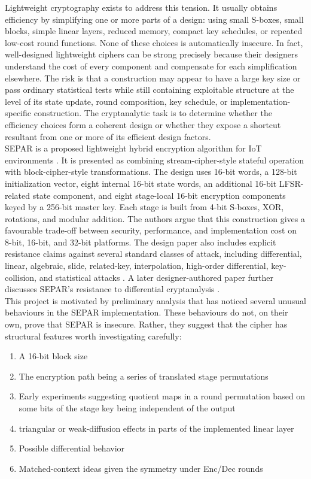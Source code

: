 \documentclass[11pt]{article}
\begin{document}
Lightweight cryptography exists to address this tension. It usually obtains efficiency by simplifying one or more parts of a design: using small S-boxes, small blocks, simple linear layers, reduced memory, compact key schedules, or repeated low-cost round functions. None of these choices is automatically insecure. In fact, well-designed lightweight ciphers can be strong precisely because their designers understand the cost of every component and compensate for each simplification elsewhere. The risk is that a construction may appear to have a large key size or pass ordinary statistical tests while still containing exploitable structure at the level of its state update, round composition, key schedule, or implementation-specific construction. The cryptanalytic task is to determine whether the efficiency choices form a coherent design or whether they expose a shortcut resultant from one or more of its efficient design factors.\\

SEPAR is a proposed lightweight hybrid encryption algorithm for IoT environments \cite{VahiJassbi2020}. It is presented as combining stream-cipher-style stateful operation with block-cipher-style transformations. The design uses 16-bit words, a 128-bit initialization vector, eight internal 16-bit state words, an additional 16-bit LFSR-related state component, and eight stage-local 16-bit encryption components keyed by a 256-bit master key. Each stage is built from 4-bit S-boxes, XOR, rotations, and modular addition. The authors argue that this construction gives a favourable trade-off between security, performance, and implementation cost on 8-bit, 16-bit, and 32-bit platforms. The design paper also includes explicit resistance claims against several standard classes of attack, including differential, linear, algebraic, slide, related-key, interpolation, high-order differential, key-collision, and statistical attacks \cite{VahiJassbi2020}. A later designer-authored paper further discusses SEPAR's resistance to differential cryptanalysis \cite{VahiMirnia2021}.\\

This project is motivated by preliminary analysis that has noticed several unusual behaviours in the SEPAR implementation. These behaviours do not, on their own, prove that SEPAR is insecure. Rather, they suggest that the cipher has structural features worth investigating carefully: 
\begin{enumerate}
	\item A 16-bit block size
	\item The encryption path being a series of translated stage permutations
	\item Early experiments suggesting quotient maps in a round permutation based on some bits of the stage key being independent of the output
	\item triangular or weak-diffusion effects in parts of the implemented linear layer
	\item Possible differential behavior 
	\item Matched-context ideas given the symmetry under Enc/Dec rounds
\end{enumerate}
\end{document}
